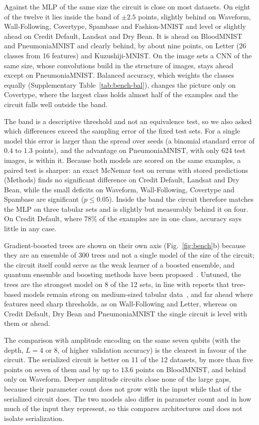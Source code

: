 \documentclass[11pt]{article}
\begin{document}
Against the MLP of the same size the circuit is close on most datasets. On eight of the twelve it lies inside the band of $\pm2.5$ points, slightly behind on Waveform, Wall-Following, Covertype, Spambase and Fashion-MNIST and level or slightly ahead on Credit Default, Landsat and Dry Bean. It is ahead on BloodMNIST and PneumoniaMNIST and clearly behind, by about nine points, on Letter (26 classes from 16 features) and Kuzushiji-MNIST. On the image sets a CNN of the same size, whose convolutions build in the structure of images, stays ahead except on PneumoniaMNIST. Balanced accuracy, which weights the classes equally (Supplementary Table~\ref{tab:bench-bal}), changes the picture only on Covertype, where the largest class holds almost half of the examples and the circuit falls well outside the band.

The band is a descriptive threshold and not an equivalence test, so we also asked which differences exceed the sampling error of the fixed test sets. For a single model this error is larger than the spread over seeds (a binomial standard error of $0.4$ to $1.3$ points), and the advantage on PneumoniaMNIST, with only 624 test images, is within it. Because both models are scored on the same examples, a paired test is sharper: an exact McNemar test on reruns with stored predictions (Methods) finds no significant difference on Credit Default, Landsat and Dry Bean, while the small deficits on Waveform, Wall-Following, Covertype and Spambase are significant ($p\le0.05$). Inside the band the circuit therefore matches the MLP on three tabular sets and is slightly but measurably behind it on four. On Credit Default, where 78\% of the examples are in one class, accuracy says little in any case.

Gradient-boosted trees are shown on their own axis (Fig.~\ref{fig:bench}b) because they are an ensemble of 300 trees and not a single model of the size of the circuit; the circuit itself could serve as the weak learner of a boosted ensemble, and quantum ensemble and boosting methods have been proposed~\cite{schuld2018ensembles,arunachalam2020boosting}. Untuned, the trees are the strongest model on 8 of the 12 sets, in line with reports that tree-based models remain strong on medium-sized tabular data~\cite{grinsztajn2022trees}, and far ahead where features need sharp thresholds, as on Wall-Following and Letter, whereas on Credit Default, Dry Bean and PneumoniaMNIST the single circuit is level with them or ahead.

The comparison with amplitude encoding on the same seven qubits (with the depth, $L=4$ or $8$, of higher validation accuracy) is the clearest in favour of the circuit. The serialized circuit is better on 11 of the 12 datasets, by more than five points on seven of them and by up to $13.6$ points on BloodMNIST, and behind only on Waveform. Deeper amplitude circuits close none of the large gaps, because their parameter count does not grow with the input while that of the serialized circuit does. The two models also differ in parameter count and in how much of the input they represent, so this compares architectures and does not isolate serialization.
\end{document}
